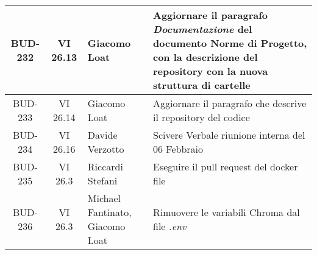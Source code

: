 \begin{table}[htbp]
\begin{tabular}{|c|c|p{}|p{}|}
    \hline
    BUD-232 & VI 26.13 & Giacomo Loat & Aggiornare il paragrafo \emph{Documentazione} del documento Norme di Progetto, con la descrizione del repository con la nuova struttura di cartelle \\
    \hline
    BUD-233 & VI 26.14 & Giacomo Loat & Aggiornare il paragrafo che descrive il repository del codice \\
    \hline
    BUD-234 & VI 26.16 & Davide Verzotto & Scivere Verbale riunione interna del 06 Febbraio \\
    \hline
    BUD-235 & VI 26.3 & Riccardi Stefani & Eseguire il pull request del docker file \\
    \hline
    BUD-236 & VI 26.3 & Michael Fantinato, Giacomo Loat & Rimuovere le variabili Chroma dal file \emph{.env} \\
    \hline
\end{tabular}
\end{table}